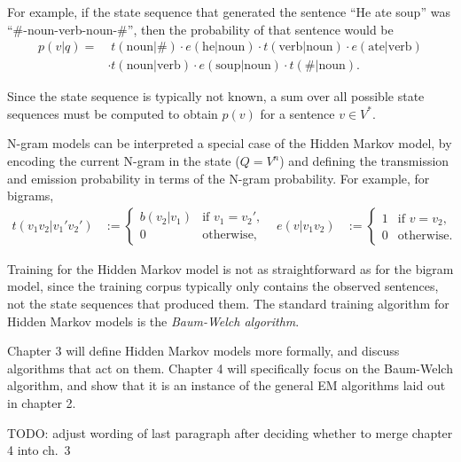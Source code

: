 For example, if the state sequence that generated the sentence ``He ate soup''
was ``\#-noun-verb-noun-\#'', then the probability of that sentence would be
\begin{align*}
 p(v|q)
  =&\; t(\text{noun}|\#) \cdot e(\text{he}|\text{noun}) \cdot t(\text{verb}|\text{noun}) \cdot e(\text{ate}|\text{verb}) \\
  &\cdot t(\text{noun}|\text{verb}) \cdot e(\text{soup}|\text{noun}) \cdot t(\#|\text{noun}).
\end{align*}

Since the state sequence is typically not known, a sum over all possible state
sequences must be computed to obtain $p(v)$ for a sentence $v\in V^*$.

N-gram models can be interpreted a special case of the Hidden Markov model, by
encoding the current N-gram in the state ($Q = V^n$) and defining the
transmission and emission probability in terms of the N-gram probability. For
example, for bigrams,
\begin{align*}
 t(v_1v_2|v_1'v_2') &:= \begin{cases}
  b(v_2|v_1) & \text{if } v_1 = v_2', \\
  0 &\text{otherwise},
 \end{cases} &
 e(v|v_1v_2) &:= \begin{cases}
  1 & \text{if } v = v_2, \\
  0 &\text{otherwise}.
 \end{cases}
\end{align*}

Training for the Hidden Markov model is not as straightforward as for the
bigram model, since the training corpus typically only contains the observed
sentences, not the state sequences that produced them. The standard training
algorithm for Hidden Markov models is the \emph{Baum-Welch algorithm}.
\cite{baupetsouwei70,baum1972}

Chapter 3 will define Hidden Markov models more formally, and discuss
algorithms that act on them. Chapter 4 will specifically focus on the
Baum-Welch algorithm, and show that it is an instance of the general EM
algorithms laid out in chapter 2.

{\color{red}TODO: adjust wording of last paragraph after deciding whether to merge chapter 4 into ch.~3}
